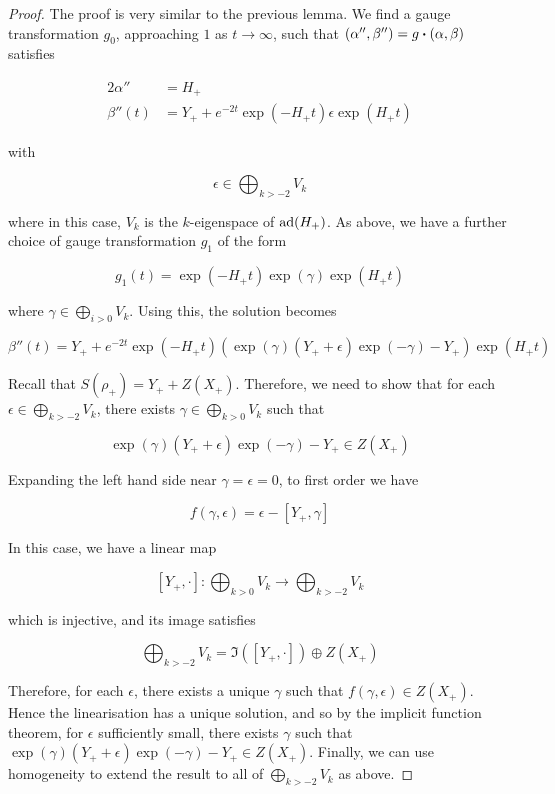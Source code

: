 \documentclass{report}
\begin{document}
\begin{proof}
    The proof is very similar to the previous lemma. We find a gauge transformation \(g_0\), approaching \(1\) as \(t \to \infty\), such that \((\alpha'', \beta'') = g\vdot (\alpha, \beta)\) satisfies

    \begin{align*}
        2\alpha'' &= H_+ \\
        \beta''(t) &= Y_+ + e^{-2t}\exp(-H_+t)\epsilon\exp(H_+t)
    \end{align*}

    with

    \[\epsilon \in \bigoplus_{k > -2}V_k\]

    where in this case, \(V_k\) is the \(k\)-eigenspace of \(\operatorname{ad}(H_+)\). As above, we have a further choice of gauge transformation \(g_1\) of the form

    \[g_1(t) = \exp(-H_+t)\exp(\gamma)\exp(H_+t)\]

    where \(\gamma \in \bigoplus_{i > 0}V_k\). Using this, the solution becomes

    \[\beta''(t) = Y_+ + e^{-2t}\exp(-H_+t)(\exp(\gamma)(Y_+ + \epsilon)\exp(-\gamma) - Y_+)\exp(H_+t)\]

    Recall that \(S(\rho_+) = Y_+ + Z(X_+)\). Therefore, we need to show that for each \(\epsilon \in \bigoplus\limits_{k > -2}V_k\), there exists \(\gamma \in \bigoplus\limits_{k > 0}V_k\) such that

    \[\exp(\gamma)(Y_+ + \epsilon)\exp(-\gamma) - Y_+ \in Z(X_+)\]

    Expanding the left hand side near \(\gamma = \epsilon = 0\), to first order we have

    \[f(\gamma, \epsilon) = \epsilon - [Y_+, \gamma]\]

    In this case, we have a linear map

    \[[Y_+, \cdot] : \bigoplus_{k > 0}V_k \to \bigoplus_{k > -2}V_k\]

    which is injective, and its image satisfies

    \[\bigoplus_{k > -2} V_k = \Im([Y_+, \cdot]) \oplus Z(X_+)\]

    Therefore, for each \(\epsilon\), there exists a unique \(\gamma\) such that \(f(\gamma, \epsilon) \in Z(X_+)\). Hence the linearisation has a unique solution, and so by the implicit function theorem, for \(\epsilon\) sufficiently small, there exists \(\gamma\) such that \(\exp(\gamma)(Y_+ + \epsilon)\exp(-\gamma) - Y_+ \in Z(X_+)\). Finally, we can use homogeneity to extend the result to all of \(\bigoplus\limits_{k > -2}V_k\) as above.
\end{proof}
\end{document}
